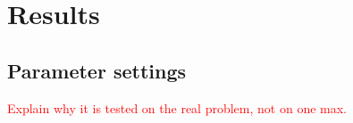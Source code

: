 \chapter{Results}\label{chapter:results}


\section{Parameter settings}
\textcolor{red}{Explain why it is tested on the real problem, not on one max.}